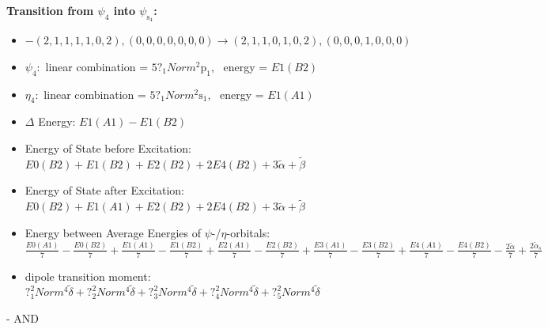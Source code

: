 \documentclass[12pt,a4paper]{article}
\begin{document}
        \noindent\textbf{Transition from $\psi_{4}$ into $\psi_{\text{s}_{4}}$:}
        \begin{itemize}
            \item $- (2, 1, 1, 1, 1, 0, 2), (0, 0, 0, 0, 0, 0, 0) \rightarrow (2, 1, 1, 0, 1, 0, 2), (0, 0, 0, 1, 0, 0, 0)$
        
            \item $\psi_{4}:$ linear combination = $5 ?_{1} Norm^{2} \text{p}_{1}$, \
            energy = $E1(B2)$
            
            \item $\eta_{4}:$ linear combination = $5 ?_{1} Norm^{2} \text{s}_{1}$, \
            energy = $E1(A1)$
            
                \item $\Delta$ Energy: $E1(A1) - E1(B2)$
                \item Energy of State before Excitation: $E0(B2) + E1(B2) + E2(B2) + 2 E4(B2) + 3 \tilde{\alpha} + \tilde{\beta}$
                \item Energy of State after Excitation: $E0(B2) + E1(A1) + E2(B2) + 2 E4(B2) + 3 \tilde{\alpha} + \tilde{\beta}$
                \item Energy between Average Energies of $\psi$-/$\eta$-orbitals: $\frac{E0(A1)}{7} - \frac{E0(B2)}{7} + \frac{E1(A1)}{7} - \frac{E1(B2)}{7} + \frac{E2(A1)}{7} - \frac{E2(B2)}{7} + \frac{E3(A1)}{7} - \frac{E3(B2)}{7} + \frac{E4(A1)}{7} - \frac{E4(B2)}{7} - \frac{2 \tilde{\alpha}}{7} + \frac{2 \tilde{\alpha}_{s}}{7}$
            
            \item dipole transition moment: $?_{1}^{2} Norm^{4} \tilde{\delta} + ?_{2}^{2} Norm^{4} \tilde{\delta} + ?_{3}^{2} Norm^{4} \tilde{\delta} + ?_{4}^{2} Norm^{4} \tilde{\delta} + ?_{5}^{2} Norm^{4} \tilde{\delta}$
        
        \end{itemize}
        
 -  AND 
\end{document}
